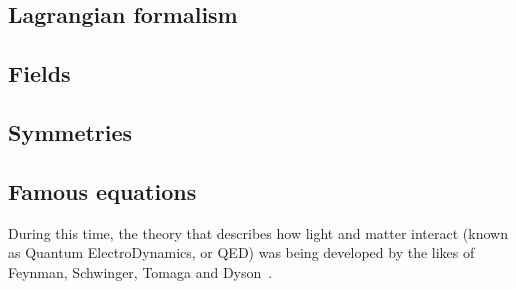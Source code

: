 \subsection{Lagrangian formalism}

\subsection{Fields}

\subsection{Symmetries}

\subsection{Famous equations}




During this time, the theory that describes how light and matter interact (known as Quantum ElectroDynamics, or QED) was being developed by the likes of Feynman, Schwinger, Tomaga and Dyson~\cite{QEDFeymnan, QEDSchwinger, QEDTomaga, QEDDyson}. 

